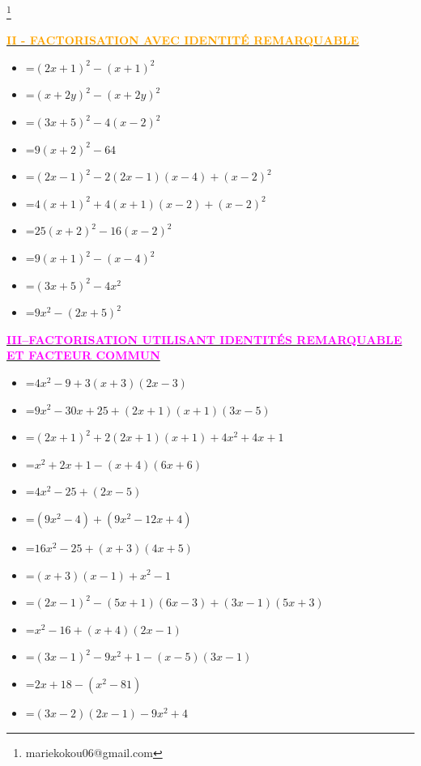 \documentclass[a4paper,12pt]{article}
\begin{document}
\begin{center}
\begin{itemize}
			
			
		\footnote{mariekokou06@gmail.com}	
		\end{itemize} 
		\vspace{1pt} 
		\textbf{\underline{\textcolor{orange}{II - FACTORISATION AVEC IDENTITÉ REMARQUABLE}}}      \\  
		
		\begin{itemize}
			\item [$C_1(x)$]=$(2x+1)^2-(x+1)^2$
			\item [$C_2(x)$]=$(x+2y)^2-(x+2y)^2$
			\item [$C_3(x)$]=$(3x+5)^2-4(x-2)^2$
			\item [$C_4(x)$]=$9(x+2)^2-64$
			\item [$C_5(x)$]=$(2x-1)^2-2(2x-1)(x-4)+(x-2)^2$
			\item [$C_6(x)$]=$4(x+1)^2+4(x+1)(x-2)+(x-2)^2$
			\item [$C_7(x)$]=$25(x+2)^2-16(x-2)^2$
			\item [$C_8(x)$]=$9(x+1)^2-(x-4)^2$
			\item [$C_9(x)$]=$(3x+5)^2-4x^2$
			\item [$C_{10}(x)$]=$9x^2-(2x+5)^2$
		\end{itemize} 
		\vspace{1pt} 
		\textbf{\underline{\textcolor{magenta}{III--FACTORISATION UTILISANT IDENTITÉS REMARQUABLE ET FACTEUR COMMUN}}} \\ 
		\begin{itemize}
			\item [$D_1(x)$]=$4x^2-9+3(x+3)(2x-3)$
			\item [$D_2(x)$]=$9x^2-30x+25+(2x+1)(x+1)(3x-5)$
			\item [$D_3(x)$]=$(2x+1)^2+2(2x+1)(x+1)+4x^2+4x+1$
			\item [$D_4(x)$]=$x^2+2x+1-(x+4)(6x+6)$
			\item [$D_5(x)$]=$4x^2-25+(2x-5)$
			\item [$D_6(x)$]=$(9x^2-4)+(9x^2-12x+4)$
			\item [$D_7(x)$]=$16x^2-25+(x+3)(4x+5)$
			\item [$D_8(x)$]=$(x+3)(x-1)+x^2-1$
			\item [$D_9(x)$]=$(2x-1)^2-(5x+1)(6x-3)+(3x-1)(5x+3)$
			\item [$D_{10}(x)$]=$x^2-16+(x+4)(2x-1)$
			\item [$D_{11}(x)$]=$(3x-1)^2-9x^2+1-(x-5)(3x-1)$
			\item [$D_{12}(x)$]=$2x+18-(x^2-81)$
			\item [$D_{13}(x)$]=$(3x-2)(2x-1)-9x^2+4$
			

\end{itemize}
\end{center}
\end{document}
